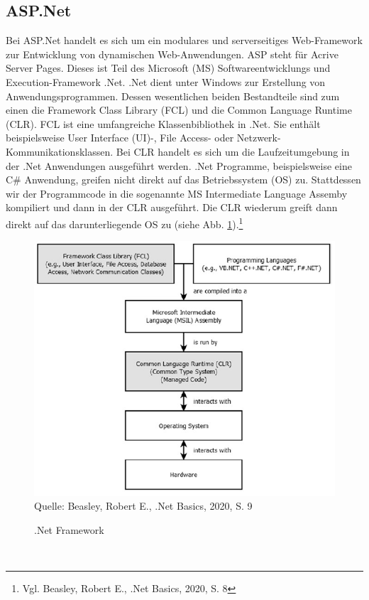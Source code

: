 \documentclass[a4paper,
12pt,
oneside]
{article}
\begin{document}
	\subsection{ASP.Net}
	Bei ASP.Net handelt es sich um ein modulares und serverseitiges Web-Framework zur Entwicklung von dynamischen Web-Anwendungen. ASP steht für \glqq Acrive Server Pages\grqq. Dieses ist Teil des Microsoft (MS) Softwareentwicklungs und Execution-Framework .Net. .Net dient unter Windows zur Erstellung von Anwendungsprogrammen. Dessen wesentlichen beiden Bestandteile sind zum einen die Framework Class Library (FCL) und die Common Language Runtime (CLR). FCL ist eine umfangreiche Klassenbibliothek in .Net. Sie enthält beispielsweise User Interface (UI)-, File Access- oder Netzwerk-Kommunikationsklassen. Bei CLR handelt es sich um die Laufzeitumgebung in der .Net Anwendungen ausgeführt werden. .Net Programme, beispielsweise eine C\# Anwendung, greifen nicht direkt auf das Betriebssystem (OS) zu. Stattdessen wir der Programmcode in die sogenannte  MS Intermediate Language Assemby kompiliert und dann in der CLR ausgeführt. Die CLR wiederum greift dann direkt auf das darunterliegende OS zu (siehe Abb. \ref{fig:dotnet}).\footnote{Vgl. Beasley, Robert E., .Net Basics, 2020, S. 8}
	\begin{figure}[h]
		\centering
		\caption{.Net Framework}
		\includegraphics[width=11.5cm]{img/dotnet.jpg} \\
		\vspace{5pt}
		\footnotesize{Quelle: Beasley, Robert E., .Net Basics, 2020, S. 9}
		\label{fig:dotnet}
	\end{figure} \\
\end{document}
